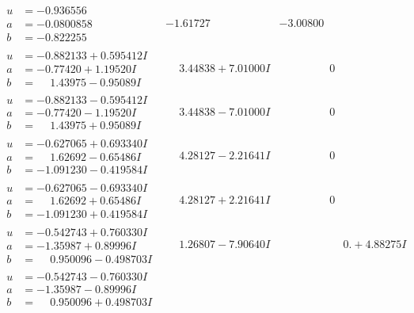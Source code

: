 \documentclass[1p]{elsarticle_modified}
\theoremstyle{definition}
\begin{document}
$$\begin{array}{c|c|c}
\begin{aligned}
u &= -0.936556\phantom{ +0.000000I} \\
a &= -0.0800858\phantom{ +0.000000I} \\
b &= -0.822255\phantom{ +0.000000I}\end{aligned}
 & -1.61727\phantom{ +0.000000I} & -3.00800\phantom{ +0.000000I} \\ \hline\begin{aligned}
u &= -0.882133 + 0.595412 I \\
a &= -0.77420 + 1.19520 I \\
b &= \phantom{-}1.43975 - 0.95089 I\end{aligned}
 & \phantom{-}3.44838 + 7.01000 I & \phantom{-0.000000 } 0 \\ \hline\begin{aligned}
u &= -0.882133 - 0.595412 I \\
a &= -0.77420 - 1.19520 I \\
b &= \phantom{-}1.43975 + 0.95089 I\end{aligned}
 & \phantom{-}3.44838 - 7.01000 I & \phantom{-0.000000 } 0 \\ \hline\begin{aligned}
u &= -0.627065 + 0.693340 I \\
a &= \phantom{-}1.62692 - 0.65486 I \\
b &= -1.091230 - 0.419584 I\end{aligned}
 & \phantom{-}4.28127 - 2.21641 I & \phantom{-0.000000 } 0 \\ \hline\begin{aligned}
u &= -0.627065 - 0.693340 I \\
a &= \phantom{-}1.62692 + 0.65486 I \\
b &= -1.091230 + 0.419584 I\end{aligned}
 & \phantom{-}4.28127 + 2.21641 I & \phantom{-0.000000 } 0 \\ \hline\begin{aligned}
u &= -0.542743 + 0.760330 I \\
a &= -1.35987 + 0.89996 I \\
b &= \phantom{-}0.950096 - 0.498703 I\end{aligned}
 & \phantom{-}1.26807 - 7.90640 I & \phantom{-0.000000 -}0. + 4.88275 I \\ \hline\begin{aligned}
u &= -0.542743 - 0.760330 I \\
a &= -1.35987 - 0.89996 I \\
b &= \phantom{-}0.950096 + 0.498703 I\end{aligned}

\end{array}$$
\end{document}
